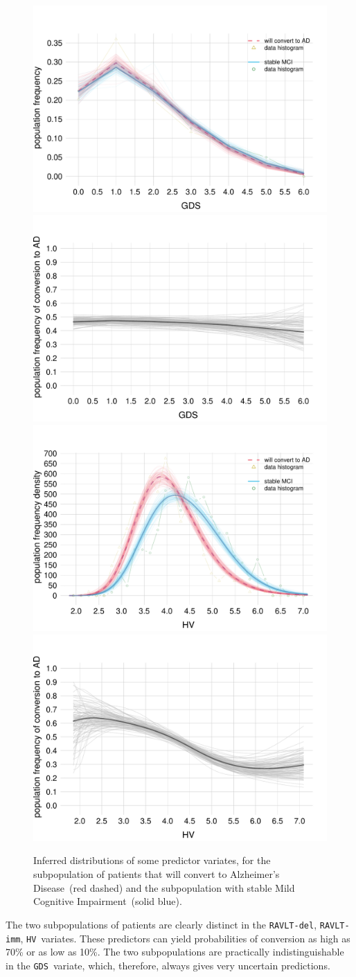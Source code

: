\documentclass[utf8]{FrontiersinHarvard} %
\renewcommand*{\|}[1][]{\nonscript\:#1\vert\nonscript\:\mathopen{}}
\newcommand*{\hv}{\texttt{HV}}
\newcommand*{\gds}{\texttt{GDS}}
\newcommand*{\ravltimm}{\texttt{RAVLT-imm}}
\newcommand*{\ravltdel}{\texttt{RAVLT-del}}
\newcommand*{\ad}{Alzheimer's Disease}
\newcommand*{\mci}{Mild Cognitive Impairment}
\begin{document}
\begin{figure}[!t]
\\
\includegraphics[width=0.43\linewidth]{population_distr_scat_GDS.pdf}%
\qquad%
\includegraphics[width=0.43\linewidth]{prob_conversion_GDS.pdf}%
\\
\includegraphics[width=0.43\linewidth]{population_distr_scat_HV.pdf}%
\qquad%
\includegraphics[width=0.43\linewidth]{prob_conversion_HV.pdf}%
\caption{Inferred distributions of some predictor variates, for the subpopulation of patients that will convert to \ad\ (\textcolor{redpurple}{red dashed}) and the subpopulation with stable \mci\ (\textcolor{bluepurple}{solid blue}).}\label{fig:marginal_pop_distributions}
\end{figure}%
%
The two subpopulations of patients are clearly distinct in the \ravltdel, \ravltimm, \hv\ variates. These predictors can yield probabilities of conversion as high as 70\% or as low as 10\%. The two subpopulations are practically indistinguishable in the \gds\ variate, which, therefore, always gives very uncertain predictions.
\end{document}
